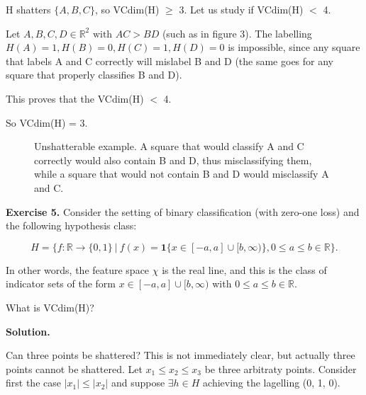 \documentclass{article}
\newcommand{\<}{\langle}
\renewcommand{\>}{\rangle}
\theoremstyle{definition}
\begin{document}
H shatters $\{A, B, C\}$, so VCdim(H) $\geq$ 3. Let us study if VCdim(H) $<$ 4.

Let $A,B,C,D \in \mathbb{R}^2 \text{ with } AC > BD$ (such as in figure 3). The labelling $H(A) = 1, H(B) = 0, H(C) = 1, H(D) = 0$ is impossible, since any square that labels A and C correctly will mislabel B and D (the same goes for any square that properly classifies B and D). 

This proves that the VCdim(H) $<$ 4.

So VCdim(H) = 3.

\begin{figure}[hbt!]
\centering
{}
\caption{Unshatterable example. A square that would classify A and C correctly would also contain B and D, thus misclassifying them, while a square that would not contain B and D would misclassify A and C.}
\label{fig:my_label}
\end{figure}

\textbf{Exercise 5.} Consider the setting of binary classification (with zero-one loss) and the following hypothesis class:

$$H = \{f : \mathbb{R} \rightarrow \{0,1\} \ | \ f(x) = \textbf{1}\{x \in [-a, a] \cup [b, \infty)\}, 0 \leq a \leq b \in \mathbb{R} \}.$$

In other words, the feature space $\chi$ is the real line, and this is the class of indicator sets of the form $x \in [-a, a] \cup [b, \infty)$ with $0 \leq a \leq b \in \mathbb{R}$. 

What is VCdim(H)?

\textbf{Solution.}

Can three points be shattered? This is not immediately clear, but actually three points cannot be shattered. Let $x_1 \leq x_2 \leq x_3$ be three arbitraty points. Consider first the case $|x_1| \leq |x_2|$ and suppose $\exists h \in H$ achieving the lagelling (0, 1, 0). 
\end{document}
